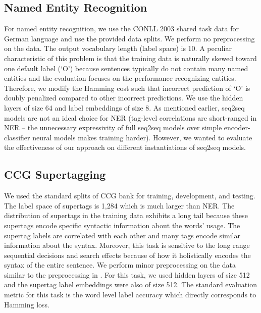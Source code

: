 \documentclass[letterpaper]{article} \usepackage{aaai18}  \usepackage{times}  \usepackage{helvet}  \usepackage{courier}  \usepackage{url}  \usepackage{graphicx}  \frenchspacing
\begin{document}
\subsection{Named Entity Recognition}
For named entity recognition, we use the CONLL 2003 shared task data \cite{tjong2003introduction} for German language and use the provided data splits. We perform no preprocessing on the data. The output vocabulary length (label space) is 10. A peculiar characteristic of this problem is that the training data is naturally skewed toward one default label (`O') because sentences typically do not contain many named entities and the evaluation focuses on the performance recognizing entities. Therefore, we modify the Hamming cost such that incorrect prediction of `O' is doubly penalized compared to other incorrect predictions. We use the hidden layers of size 64 and label embeddings of size 8. As mentioned earlier, seq2seq models are not an ideal choice for NER (tag-level correlations are short-ranged in NER -- the unnecessary expressivity of full seq2seq models over simple encoder-classifier neural models makes training harder). However, we wanted to evaluate the effectiveness of our approach on different instantiations of seq2seq models.
\subsection{CCG Supertagging}
We used the standard splits of CCG bank \cite{hockenmaier2002acquiring} for training, development, and testing. The label space of supertags is 1,284 which is much larger than NER. The distribution of supertags in the training data exhibits a long tail because these supertags encode specific syntactic information about the words' usage. The supertag labels are correlated with each other and many tags encode similar information about the syntax. Moreover, this task is sensitive to the long range sequential decisions and search effects because of how it holistically encodes the syntax of the entire sentence. We perform minor preprocessing on the data similar to the preprocessing in \cite{vaswani2016supertagging}. For this task, we used hidden layers of size 512 and the supertag label embeddings were also of size 512. The standard evaluation metric for this task is the word level label accuracy which directly corresponds to Hamming loss.
\end{document}
